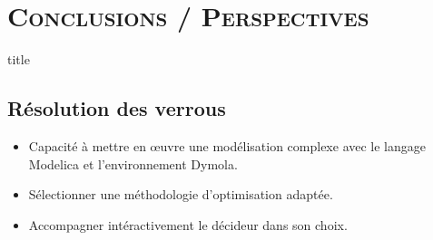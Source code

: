 \documentclass[xcolor=x11names, compress, 11pt]{beamer}
\begin{document}
\begin{frame}[t]
    \vfill
    \centering
    \begin{adjustwidth}{-2.6em}{-2.6em}
    \end{adjustwidth}
    \vfill
\end{frame}














\section{\scshape Conclusions / Perspectives}
\begin{frame}[plain]
    \vfill
    \centering
    \begin{beamercolorbox}[sep=8pt,center,shadow=true,rounded=true]{title}
    \insertsectionhead\par%
    \end{beamercolorbox}
    \vfill
\end{frame}


\subsection{Résolution des verrous}
\begin{frame}[t]
    \vfill
    \small
    \begin{itemize}
        \item Capacité à mettre en œuvre une modélisation complexe avec le
              langage Modelica et l’environnement Dymola.
        \vfill
        \item Sélectionner une méthodologie d’optimisation adaptée.
        \vfill
        \item Accompagner intéractivement le décideur dans son choix.
    \end{itemize}
    \vfill
\end{frame}
\end{document}
